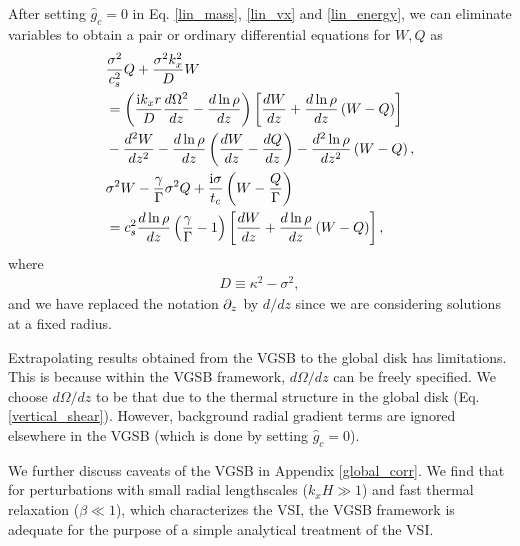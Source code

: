 After setting $\hat{g}_c=0$ in Eq. \ref{lin_mass}, \ref{lin_vx} and
\ref{lin_energy}, we can eliminate variables %
to obtain a pair or ordinary differential
equations for $W,Q$ as
\begin{align}
  &\frac{\sigma^2}{c_s^2}Q + \frac{\sigma^2k_x^2}{D}W \notag\\ 
  &=\left(\frac{\mathrm{i}
      k_x r}{D}\frac{d\Omega^2}{dz} -
    \frac{d\ln{\rho}}{dz}\right)\left[\frac{dW}{dz} +
    \frac{d\ln{\rho}}{dz}\left(W-Q\right)\right] \notag\\
  &- \frac{d^2W}{dz^2} - \frac{d\ln{\rho}}{dz}\left(\frac{dW}{dz} -
    \frac{dQ}{dz}\right) - \frac{d^2\ln{\rho}}{dz^2}\left(W-Q\right),\label{ode_w}\\
  &\sigma^2W - \frac{\gamma}{\Gamma}\sigma^2 Q +
  \frac{\mathrm{i}\sigma}{t_c}\left(W-\frac{Q}{\Gamma}\right)\notag\\
  &=c_s^2\frac{d\ln{\rho}}{dz}\left(\frac{\gamma}{\Gamma} - 1\right) 
  \left[\frac{dW}{dz} + \frac{d\ln{\rho}}{dz}\left(W-Q\right)\right],\label{ode_Q} 
\end{align}
where
\begin{align}
  D \equiv \kappa^2 - \sigma^2,
\end{align} 
and we have replaced the notation $\partial_z$ by $d/dz$ since we are
considering solutions at a fixed radius. 

Extrapolating results obtained from the VGSB to the global disk has
limitations. This is because within the VGSB framework, $d\Omega/dz$
can be freely specified. %
We choose $d\Omega/dz$ to be that due to the thermal structure in 
the global disk (Eq. \ref{vertical_shear}). However, background radial
gradient terms are ignored elsewhere in the VGSB (which is done by
setting $\hat{g}_c=0$).       


We further discuss caveats of the VGSB in Appendix
\ref{global_corr}. We find that for perturbations with small radial
lengthscales ($k_xH\gg 1$) and fast thermal relaxation ($\beta\ll1$),
which characterizes the VSI, the VGSB framework is adequate for the
purpose of a simple analytical treatment of the VSI.  

